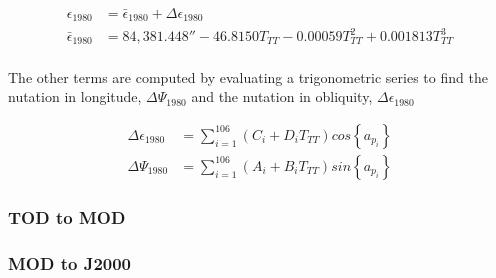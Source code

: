 \documentclass[12pt,letterpaper]{paper}
\begin{document}
\begin{align}
\epsilon_{1980} &= \bar{\epsilon}_{1980} + \Delta \epsilon_{1980} \\
\bar{\epsilon}_{1980} &= 84,381.448'' - 46.8150T_{TT} - 0.00059T^2_{TT} + 0.001813 T^3_{TT}\\
\end{align}


The other terms are computed by evaluating a trigonometric series to find the nutation in longitude, $\Delta\Psi_{1980}$ and the nutation in obliquity,  $\Delta \epsilon_{1980}$

\begin{align}
\Delta \epsilon_{1980} &= \sum_{i=1}^{106} (C_i + D_i T_{TT})cos\left\lbrace{a_{p_i}}\right\rbrace \\
\Delta \Psi_{1980} &= \sum_{i=1}^{106} (A_i + B_i T_{TT})sin\left\lbrace{a_{p_i}}\right\rbrace
\end{align}

\subsubsection{TOD to MOD}


\subsubsection{MOD to J2000}

%
%
%
%
%
%
%
%
%
%
%
\end{document}
